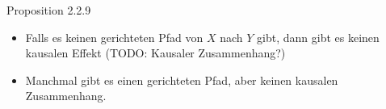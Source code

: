 \begin{frame}{Proposition 2.2.9}
    \begin{itemize}
        \item<1-> Falls es keinen gerichteten Pfad von $X$ nach $Y$ gibt, dann
                  gibt es keinen kausalen Effekt (TODO: Kausaler Zusammenhang?)
        \item<2-> Manchmal gibt es einen gerichteten Pfad, aber keinen kausalen
                  Zusammenhang.
    \end{itemize}
\end{frame}

